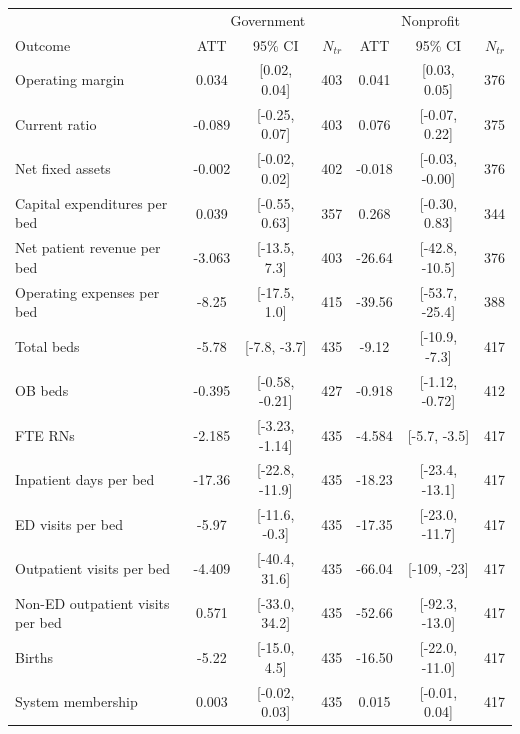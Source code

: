 \begin{tabular}{lccrccr}
 & \multicolumn{3}{c}{Government} & \multicolumn{3}{c}{Nonprofit} \\
Outcome & ATT & 95\% CI & $N_{tr}$ & ATT & 95\% CI & $N_{tr}$ \\
Operating margin & 0.034 & [0.02, 0.04] & 403 & 0.041 & [0.03, 0.05] & 376 \\
Current ratio & -0.089 & [-0.25, 0.07] & 403 & 0.076 & [-0.07, 0.22] & 375 \\
Net fixed assets & -0.002 & [-0.02, 0.02] & 402 & -0.018 & [-0.03, -0.00] & 376 \\
Capital expenditures per bed & 0.039 & [-0.55, 0.63] & 357 & 0.268 & [-0.30, 0.83] & 344 \\
Net patient revenue per bed & -3.063 & [-13.5, 7.3] & 403 & -26.64 & [-42.8, -10.5] & 376 \\
Operating expenses per bed & -8.25 & [-17.5, 1.0] & 415 & -39.56 & [-53.7, -25.4] & 388 \\
Total beds & -5.78 & [-7.8, -3.7] & 435 & -9.12 & [-10.9, -7.3] & 417 \\
OB beds & -0.395 & [-0.58, -0.21] & 427 & -0.918 & [-1.12, -0.72] & 412 \\
FTE RNs & -2.185 & [-3.23, -1.14] & 435 & -4.584 & [-5.7, -3.5] & 417 \\
Inpatient days per bed & -17.36 & [-22.8, -11.9] & 435 & -18.23 & [-23.4, -13.1] & 417 \\
ED visits per bed & -5.97 & [-11.6, -0.3] & 435 & -17.35 & [-23.0, -11.7] & 417 \\
Outpatient visits per bed & -4.409 & [-40.4, 31.6] & 435 & -66.04 & [-109, -23] & 417 \\
Non-ED outpatient visits per bed & 0.571 & [-33.0, 34.2] & 435 & -52.66 & [-92.3, -13.0] & 417 \\
Births & -5.22 & [-15.0, 4.5] & 435 & -16.50 & [-22.0, -11.0] & 417 \\
System membership & 0.003 & [-0.02, 0.03] & 435 & 0.015 & [-0.01, 0.04] & 417 \\
\end{tabular}
